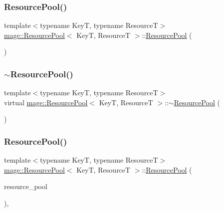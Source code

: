 \subsubsection{\texorpdfstring{Resource\+Pool()}{ResourcePool()}\hspace{0.1cm}{\footnotesize\ttfamily [1/3]}}
{\footnotesize\ttfamily template$<$typename KeyT, typename ResourceT$>$ \\
\hyperlink{classmage_1_1_resource_pool}{mage\+::\+Resource\+Pool}$<$ KeyT, ResourceT $>$\+::\hyperlink{classmage_1_1_resource_pool}{Resource\+Pool} (\begin{DoxyParamCaption}{ }\end{DoxyParamCaption})\hspace{0.3cm}{\ttfamily [default]}}

\hypertarget{classmage_1_1_resource_pool_ae4fff3d951818d417f77965c2db265f6}{}\label{classmage_1_1_resource_pool_ae4fff3d951818d417f77965c2db265f6} 
\subsubsection{\texorpdfstring{$\sim$\+Resource\+Pool()}{~ResourcePool()}}
{\footnotesize\ttfamily template$<$typename KeyT, typename ResourceT$>$ \\
virtual \hyperlink{classmage_1_1_resource_pool}{mage\+::\+Resource\+Pool}$<$ KeyT, ResourceT $>$\+::$\sim$\hyperlink{classmage_1_1_resource_pool}{Resource\+Pool} (\begin{DoxyParamCaption}{ }\end{DoxyParamCaption})\hspace{0.3cm}{\ttfamily [virtual]}}

\hypertarget{classmage_1_1_resource_pool_a82253c9c4adfc120a813dfe811dd5e91}{}\label{classmage_1_1_resource_pool_a82253c9c4adfc120a813dfe811dd5e91} 
\subsubsection{\texorpdfstring{Resource\+Pool()}{ResourcePool()}\hspace{0.1cm}{\footnotesize\ttfamily [2/3]}}
{\footnotesize\ttfamily template$<$typename KeyT, typename ResourceT$>$ \\
\hyperlink{classmage_1_1_resource_pool}{mage\+::\+Resource\+Pool}$<$ KeyT, ResourceT $>$\+::\hyperlink{classmage_1_1_resource_pool}{Resource\+Pool} (\begin{DoxyParamCaption}\item[{const \hyperlink{classmage_1_1_resource_pool}{Resource\+Pool}$<$ KeyT, ResourceT $>$ \&}]{resource\+\_\+pool }\end{DoxyParamCaption})\hspace{0.3cm}{\ttfamily [private]}, {\ttfamily [delete]}}

